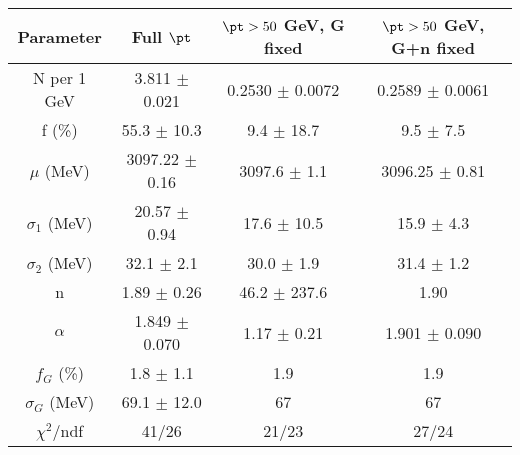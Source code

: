 \begin{tabular}{c||c|c|c}
Parameter & Full $\pt$ & $\pt>50$ GeV, G fixed & $\pt>50$ GeV, G+n fixed \\
\hline
N per 1 GeV & 3.811 $\pm$ 0.021 & 0.2530 $\pm$ 0.0072 & 0.2589 $\pm$ 0.0061\\
f (\%) & 55.3 $\pm$ 10.3 & 9.4 $\pm$ 18.7 & 9.5 $\pm$ 7.5\\
$\mu$ (MeV) & 3097.22 $\pm$ 0.16 & 3097.6 $\pm$ 1.1 & 3096.25 $\pm$ 0.81\\
$\sigma_1$ (MeV) & 20.57 $\pm$ 0.94 & 17.6 $\pm$ 10.5 & 15.9 $\pm$ 4.3\\
$\sigma_2$ (MeV) & 32.1 $\pm$ 2.1 & 30.0 $\pm$ 1.9 & 31.4 $\pm$ 1.2\\
n & 1.89 $\pm$ 0.26 & 46.2 $\pm$ 237.6 & 1.90\\
$\alpha$ & 1.849 $\pm$ 0.070 & 1.17 $\pm$ 0.21 & 1.901 $\pm$ 0.090\\
$f_G$ (\%) & 1.8 $\pm$ 1.1 & 1.9 & 1.9\\
$\sigma_G$ (MeV) & 69.1 $\pm$ 12.0 & 67 & 67\\
\hline
$\chi^2$/ndf & 41/26 & 21/23 & 27/24\\
\end{tabular}

